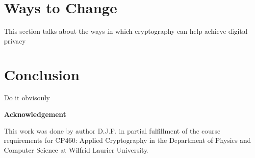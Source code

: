 \documentclass[12pt]{article}
\begin{document}
\section{Ways to  Change}\label{sec:developers}
This section talks about the ways in which cryptography can help achieve digital privacy

\section{Conclusion}\label{sec:conclusion}
Do it obvisouly

\begin{center}
{\bf Acknowledgement}
\end{center}
This work was done by author D.J.F. in partial fulfillment of the course requirements for CP460: Applied Cryptography in the Department of Physics and Computer Science at Wilfrid Laurier University.
\end{document}
